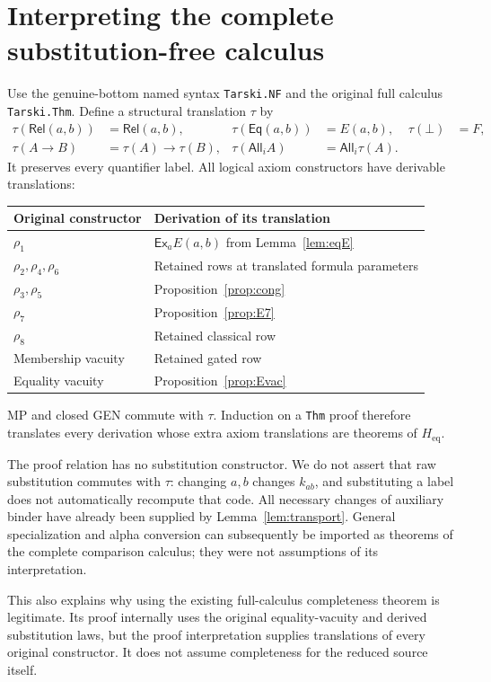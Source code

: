 \documentclass[11pt,letterpaper]{article}
\theoremstyle{definition}\newtheorem{definition}[theorem]{Definition}
\theoremstyle{remark}\newtheorem{remark}[theorem]{Remark}
\newcommand{\Rel}{\mathsf{Rel}}
\newcommand{\Eq}{\mathsf{Eq}}
\newcommand{\All}{\mathsf{All}}
\newcommand{\Ex}{\mathsf{Ex}}
\newcommand{\To}{\rightarrow}
\newcommand{\Hh}{H_{\mathrm{eq}}}
\newcommand{\file}[1]{\begingroup\small\ttfamily\nolinkurl{#1}\endgroup}
\begin{document}
\section{Interpreting the complete substitution-free calculus}\label{sec:interpretation}
Use the genuine-bottom named syntax \file{Tarski.NF} and the original full calculus \file{Tarski.Thm}. Define a structural translation $\tau$ by
\begin{align*}
\tau(\Rel(a,b))&=\Rel(a,b),& \tau(\Eq(a,b))&=E(a,b),&\tau(\bot)&=F,\\
\tau(A\To B)&=\tau(A)\To\tau(B),&
\tau(\All_i A)&=\All_i\tau(A).
\end{align*}
It preserves every quantifier label. All logical axiom constructors have derivable translations:
\begin{center}
\begin{tabular}{@{}ll@{}}
\toprule
Original constructor & Derivation of its translation\\\midrule
$\rho_1$ & $\Ex_aE(a,b)$ from Lemma~\ref{lem:eqE}\\
$\rho_2,\rho_4,\rho_6$ & Retained rows at translated formula parameters\\
$\rho_3,\rho_5$ & Proposition~\ref{prop:cong}\\
$\rho_7$ & Proposition~\ref{prop:E7}\\
$\rho_8$ & Retained classical row\\
Membership vacuity & Retained gated row\\
Equality vacuity & Proposition~\ref{prop:Evac}\\\bottomrule
\end{tabular}
\end{center}
MP and closed GEN commute with $\tau$. Induction on a \file{Thm} proof therefore translates every derivation whose extra axiom translations are theorems of $\Hh$.

The proof relation has no substitution constructor. We do not assert that raw substitution commutes with $\tau$: changing $a,b$ changes $k_{ab}$, and substituting a label does not automatically recompute that code. All necessary changes of auxiliary binder have already been supplied by Lemma~\ref{lem:transport}. General specialization and alpha conversion can subsequently be imported as theorems of the complete comparison calculus; they were not assumptions of its interpretation.

This also explains why using the existing full-calculus completeness theorem is legitimate. Its proof internally uses the original equality-vacuity and derived substitution laws, but the proof interpretation supplies translations of every original constructor. It does not assume completeness for the reduced source itself.
\end{document}
